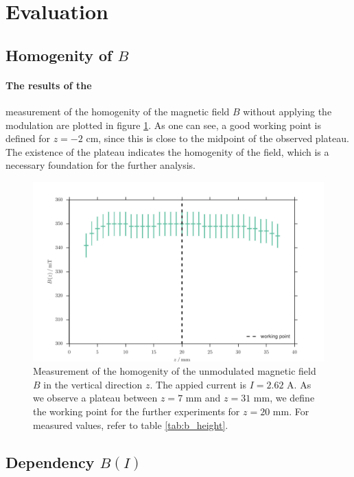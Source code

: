 \section{Evaluation}
\subsection{Homogenity of $B$}
\paragraph{The results of the}
measurement of the homogenity of the magnetic field $B$ 
without applying the modulation are plotted in figure 
\ref{fig:b_height}. As one can see, a good working point is defined for $z = -2$ cm, since 
this is close to the midpoint of the observed plateau. The existence of the plateau indicates the homogenity 
of the field, which is a necessary foundation for the further analysis.
\begin{figure}[H]
    \centering
    \includegraphics[width=1.0\textwidth]{figures/b_height.pdf}
    \caption{   
        Measurement of the homogenity of the unmodulated magnetic field $B$ in the vertical direction $z$. 
        The appied current is $I = 2.62$ A. As we observe a plateau between $z = 7$ mm and $z = 31$ mm, 
        we define the working point for the further experiments for $z = 20$ mm.
        For measured values, refer to table \ref{tab:b_height}.
        }
    \label{fig:b_height}
\end{figure}
\FloatBarrier


\subsection{Dependency $B(I)$}
